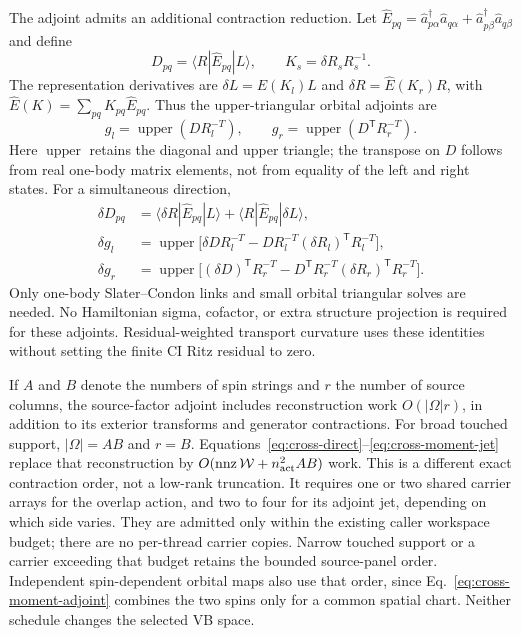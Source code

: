 \documentclass[11pt,a4paper]{article}
\newcommand{\Tr}{^{\mathsf T}}
\newcommand{\Wa}{\mathcal W}
\begin{document}
The adjoint admits an additional contraction reduction. Let
$\hat E_{pq}=\hat a^\dagger_{p\alpha}\hat a_{q\alpha}
+\hat a^\dagger_{p\beta}\hat a_{q\beta}$ and define
\begin{equation}
 D_{pq}=\langle R|\hat E_{pq}|L\rangle,\qquad
 K_s=\delta R_sR_s^{-1}.
\end{equation}
The representation derivatives are
$\delta L=\hat E(K_l)L$ and $\delta R=\hat E(K_r)R$, with
$\hat E(K)=\sum_{pq}K_{pq}\hat E_{pq}$. Thus the upper-triangular
orbital adjoints are
\begin{equation}
 g_l=\operatorname{upper}(DR_l^{-T}),\qquad
 g_r=\operatorname{upper}(D\Tr R_r^{-T}).
 \label{eq:cross-moment-adjoint}
\end{equation}
Here $\operatorname{upper}$ retains the diagonal and upper triangle;
the transpose on $D$ follows from real one-body matrix elements, not from
equality of the left and right states. For a simultaneous direction,
\begin{align}
 \delta D_{pq}&=\langle\delta R|\hat E_{pq}|L\rangle
                 +\langle R|\hat E_{pq}|\delta L\rangle,\\
 \delta g_l&=\operatorname{upper}\bigl[
   \delta D R_l^{-T}-DR_l^{-T}(\delta R_l)\Tr R_l^{-T}\bigr],\\
 \delta g_r&=\operatorname{upper}\bigl[
   (\delta D)\Tr R_r^{-T}
   -D\Tr R_r^{-T}(\delta R_r)\Tr R_r^{-T}\bigr].
 \label{eq:cross-moment-jet}
\end{align}
Only one-body Slater--Condon links and small orbital triangular solves are
needed. No Hamiltonian sigma, cofactor, or extra structure projection is
required for these adjoints. Residual-weighted transport curvature uses
these identities without setting the finite CI Ritz residual to zero.

If $A$ and $B$ denote the numbers of spin strings and $r$ the number of
source columns, the source-factor adjoint includes reconstruction work
$O(|\Omega|r)$, in addition to its exterior transforms and generator
contractions. For broad touched support, $|\Omega|=AB$ and $r=B$.
Equations~\eqref{eq:cross-direct}--\eqref{eq:cross-moment-jet} replace that
reconstruction by $O(\operatorname{nnz}\Wa+n_{\rm act}^2 AB)$ work.
This is a different exact contraction order, not a low-rank truncation.
It requires one or two shared carrier arrays for the overlap action,
and two to four for its adjoint jet, depending on which side varies.
They are admitted only within the existing caller workspace budget;
there are no per-thread carrier copies. Narrow touched support or a
carrier exceeding that budget retains the bounded source-panel order.
Independent spin-dependent orbital maps also use that order, since
Eq.~\eqref{eq:cross-moment-adjoint} combines the two spins only for a
common spatial chart. Neither schedule changes the selected VB space.
\end{document}
